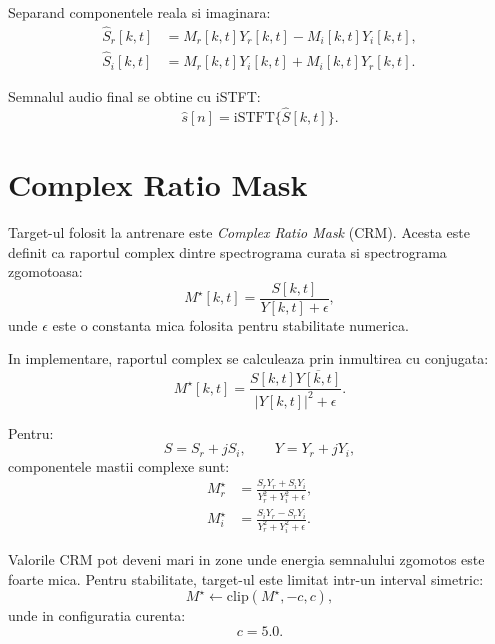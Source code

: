 \documentclass[12pt,a4paper]{article}
\begin{document}
Separand componentele reala si imaginara:
\begin{align}
    \hat{S}_r[k,t] &= M_r[k,t]Y_r[k,t] - M_i[k,t]Y_i[k,t], \\
    \hat{S}_i[k,t] &= M_r[k,t]Y_i[k,t] + M_i[k,t]Y_r[k,t].
\end{align}

Semnalul audio final se obtine cu iSTFT:
\begin{equation}
    \hat{s}[n] = \mathrm{iSTFT}\{\hat{S}[k,t]\}.
\end{equation}

\section{Complex Ratio Mask}

Target-ul folosit la antrenare este \textit{Complex Ratio Mask} (CRM). Acesta este
definit ca raportul complex dintre spectrograma curata si spectrograma zgomotoasa:
\begin{equation}
    M^{\star}[k,t] = \frac{S[k,t]}{Y[k,t] + \epsilon},
\end{equation}
unde $\epsilon$ este o constanta mica folosita pentru stabilitate numerica.

In implementare, raportul complex se calculeaza prin inmultirea cu conjugata:
\begin{equation}
    M^{\star}[k,t] =
    \frac{S[k,t]\overline{Y[k,t]}}{|Y[k,t]|^2 + \epsilon}.
\end{equation}

Pentru:
\begin{equation}
    S = S_r + jS_i,
    \qquad
    Y = Y_r + jY_i,
\end{equation}
componentele mastii complexe sunt:
\begin{align}
    M_r^{\star} &=
    \frac{S_rY_r + S_iY_i}{Y_r^2 + Y_i^2 + \epsilon}, \\
    M_i^{\star} &=
    \frac{S_iY_r - S_rY_i}{Y_r^2 + Y_i^2 + \epsilon}.
\end{align}

Valorile CRM pot deveni mari in zone unde energia semnalului zgomotos este foarte
mica. Pentru stabilitate, target-ul este limitat intr-un interval simetric:
\begin{equation}
    M^{\star} \leftarrow
    \mathrm{clip}(M^{\star}, -c, c),
\end{equation}
unde in configuratia curenta:
\begin{equation}
    c = 5.0.
\end{equation}
\end{document}
